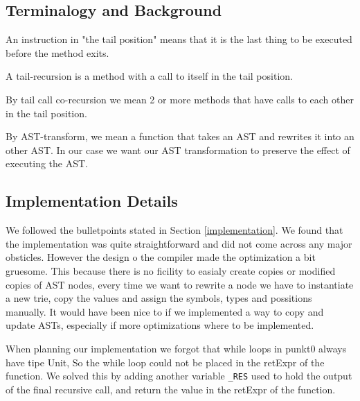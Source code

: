 \subsection{Terminalogy and Background}
An instruction in "the tail position" means that it is the last thing to be executed before the method exits.

A tail-recursion is a method with a call to itself in the tail position.

By tail call co-recursion we mean 2 or more methods that have calls to each other in the tail position.

By AST-transform, we mean a function that takes an AST and rewrites it into an other AST. In our case we want our AST transformation to preserve the effect of executing the AST.

\subsection{Implementation Details}
\label{sec:details}
We followed the bulletpoints stated in Section \ref{implementation}. We found that the implementation was quite straightforward and did not 
come across any major obsticles. However the design o the compiler made the optimization a bit gruesome. This because there is no ficility to easialy create copies or modified copies of AST nodes,
every time we want to rewrite a node we have to instantiate a new trie, copy the values and assign the symbols, types and possitions manually. It would have been nice to if we implemented a way to copy and update ASTs, especially if more optimizations where to be implemented.

When planning our implementation we forgot that while loops in punkt0 always have tipe Unit, So the while loop could not be placed in the retExpr of the function. We solved this by adding another variable \texttt{_RES} used to hold the output of the final recursive call, and return the value in the retExpr of the function.
